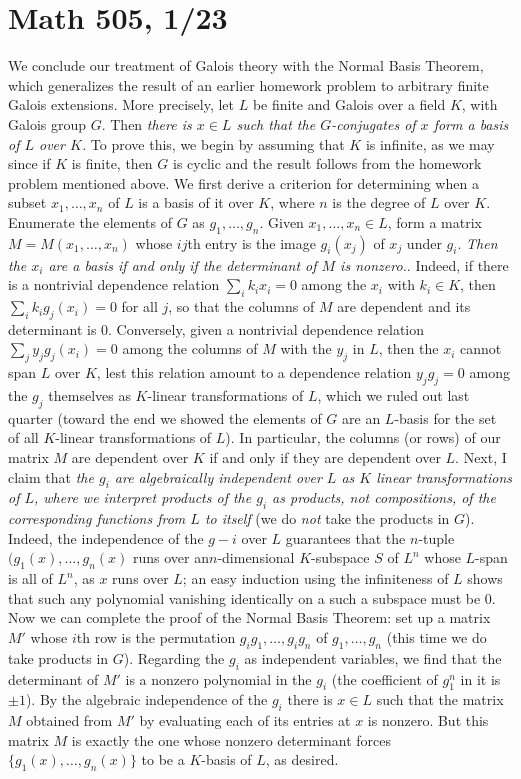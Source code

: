 \documentclass[10pt]{article}
\begin{document}
\section*{Math 505, 1/23}

We conclude our treatment of Galois theory with the Normal Basis
Theorem, which generalizes the result of an earlier homework problem to
arbitrary finite Galois extensions. More precisely, let $L$ be finite
and Galois over a field $K$, with Galois group $G$. Then {\sl there is
  $x\in L$ such that the $G$-conjugates of $x$ form a basis of $L$ over
  $K$.} To prove this, we begin by assuming that $K$ is infinite, as we
may since if $K$ is finite, then $G$ is cyclic and the result follows
from the homework problem mentioned above. We first derive a criterion
for determining when a subset $x_1,\ldots,x_n$ of $L$ is a basis of it
over $K$, where $n$ is the degree of $L$ over $K$. Enumerate the
elements of $G$ as $g_1,\ldots,g_n$. Given $x_1,\ldots,x_n\in L$, form a
matrix $M =M(x_1,\ldots,x_n)$ whose $ij$th entry is the image $g_i(x_j)$
of $x_j$ under $g_i$. {\sl Then the $x_i$ are a basis if and only if the
  determinant of $M$ is nonzero.}. Indeed, if there is a nontrivial
dependence relation $\sum_i k_i x_i = 0$ among the $x_i$ with $k_i\in
K$, then $\sum_i k_i g_j(x_i) = 0$ for all $j$, so that the columns of
$M$ are dependent and its determinant is 0. Conversely, given a
nontrivial dependence relation $\sum_j y_j g_j(x_i) = 0$ among the
columns of $M$ with the $y_j$ in $L$, then the $x_i$ cannot span $L$
over $K$, lest this relation amount to a dependence relation $y_j g_j =
0$ among the $g_j$ themselves as $K$-linear transformations of $L$,
which we ruled out last quarter (toward the end we showed the elements
of $G$ are an $L$-basis for the set of all $K$-linear transformations of
$L$). In particular, the columns (or rows) of our matrix $M$ are
dependent over $K$ if and only if they are dependent over $L$. Next, I
claim that {\sl the $g_i$ are algebraically independent over $L$ as $K$
  linear transformations of $L$, where we interpret products of the
  $g_i$ as products, not compositions, of the corresponding functions
  from $L$ to itself} (we do {\sl not} take the products in $G$).
Indeed, the independence of the $g-i$ over $L$ guarantees that the
$n$-tuple $(g_1(x),\ldots,g_n(x)$ runs over an$n$-dimensional
$K$-subspace $S$ of $L^n$ whose $L$-span is all of $L^n$, as $x$ runs
over $L$; an easy induction using the infiniteness of $L$ shows that
such any polynomial vanishing identically on a such a subspace must be
0. Now we can complete the proof of the Normal Basis Theorem: set up a
matrix $M'$ whose $i$th row is the permutation $g_i g_1,\ldots,g_i g_n$
of $g_1,\ldots,g_n$ (this time we do take products in $G$). Regarding
the $g_i$ as independent variables, we find that the determinant of $M'$
is a nonzero polynomial in the $g_i$ (the coefficient of $g_1^n$ in it
is $\pm 1$). By the algebraic independence of the $g_i$ there is $x\in
L$ such that the matrix $M$ obtained from $M'$ by evaluating each of its
entries at $x$ is nonzero. But this matrix $M$ is exactly the one whose
nonzero determinant forces $\{g_1(x),\ldots,g_n(x)\}$ to be a $K$-basis
of $L$, as desired.
\end{document}
